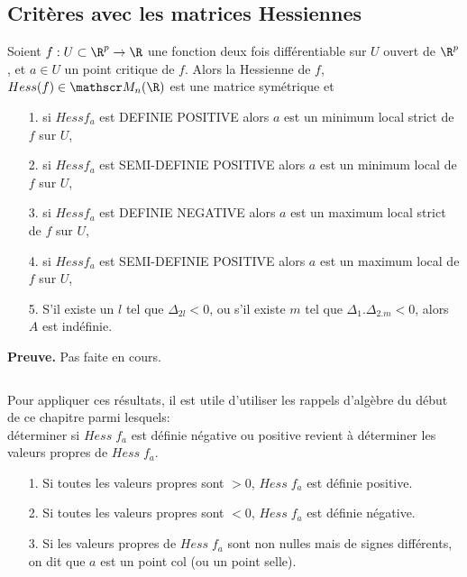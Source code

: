 \documentclass[class=report,crop=false]{standalone}
\begin{document}
\subsection{Critères avec les matrices Hessiennes}



\begin{theoreme}
\textcolor[rgb]{0.44,0.00,0.87}{
   Soient $f:U \subset \R^p \rightarrow \R$ une fonction deux fois différentiable sur $U$ ouvert de $\R^p$, et $a \in U$ un point critique de $f$.
 Alors la Hessienne de $f$,  $Hess(f) \in \mat_n(\R)$ est une matrice symétrique et 
 \begin{itemize}
 \item[1.]si $Hess f_a$ est DEFINIE POSITIVE alors $a$ est un minimum local strict de $f$ sur $U$,
 \item[2.] si $Hess f_a$ est SEMI-DEFINIE POSITIVE alors $a$ est un minimum local  de $f$ sur $U$,
 \item[3.]si $Hess f_a$ est DEFINIE NEGATIVE alors $a$ est un maximum local strict de $f$ sur $U$,
 \item[4.] si $Hess f_a$ est SEMI-DEFINIE POSITIVE alors $a$ est un maximum local  de $f$ sur $U$,
 \item[5.] S'il existe un $l$ tel que $\Delta_{2l} <0$, ou s'il existe $m$ tel que $\Delta_1.\Delta_{2.m}<0$, alors $A$ est indéfinie.
 \end{itemize}}
\end{theoreme}

{\textbf{Preuve.}} Pas faite en cours.

\begin{remarque*} $ $\\
\textcolor[rgb]{0.00,0.00,1.00}{
Pour appliquer ces résultats, il est utile d'utiliser les rappels d'algèbre du début de ce chapitre parmi lesquels: \\
  d\'eterminer si $Hess \; f_a$ est d\'efinie n\'egative ou positive revient \`a d\'eterminer
  les valeurs propres de $Hess \; f_a$.
  \begin{itemize}
    \item[1.] Si toutes les valeurs propres sont $>0$, $Hess \; f_a$ est d\'efinie positive.
    \item[2.] Si toutes les valeurs propres sont $<0$, $Hess \; f_a$ est d\'efinie n\'egative.
    \item[3.] Si les valeurs propres de $Hess \; f_a$ sont non nulles mais de signes diff\'erents, on dit que
    $a$ est un point col (ou un point selle).
  \end{itemize}}
\end{remarque*}
\end{document}
